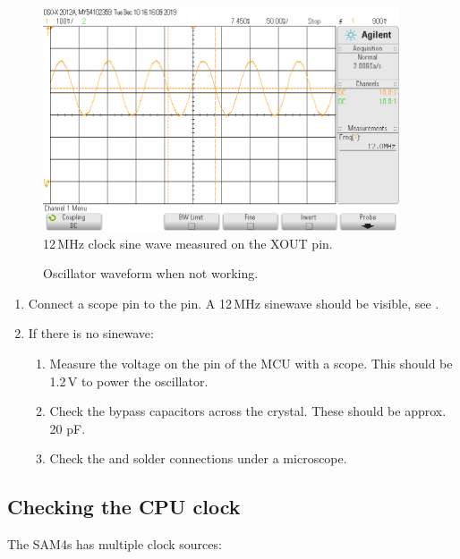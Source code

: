 \begin{figure}[!h]
\centering
\includegraphics[height=2.60417in]{figs/ClockSignal.png}
\caption{12\,MHz clock sine wave measured on the XOUT pin.}
\label{fig:xout}
\end{figure}

\begin{figure}[!h]
  \centering
  \caption{Oscillator waveform when not working.}
\end{figure}

\begin{enumerate}
\item Connect a scope pin to the  pin. A 12\,MHz sinewave
  should be visible, see .

\item If there is no sinewave:

  \begin{enumerate}
  \item Measure the voltage on the  pin of the MCU with a
    scope. This should be 1.2\,V to power the oscillator.

  \item Check the bypass capacitors across the crystal.  These should
    be approx. 20 pF.

  \item Check the  and  solder connections under a
    microscope.
  \end{enumerate}
\end{enumerate}


\subsection{Checking the CPU clock}
\label{checking-the-clock}

The SAM4s has multiple clock sources:

